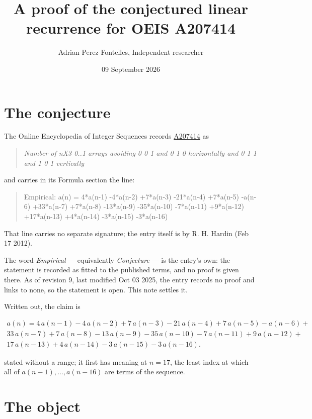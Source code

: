 \documentclass[11pt]{article}
\title{A proof of the conjectured linear recurrence for OEIS A207414}
\author{Adrian Perez Fontelles, Independent researcher}
\date{09 September 2026}
\theoremstyle{definition}
\begin{document}
\maketitle
\section{The conjecture}

The Online Encyclopedia of Integer Sequences records \href{https://oeis.org/A207414}{A207414} as

\begin{quote}\itshape Number of nX3 0..1 arrays avoiding 0 0 1 and 0 1 0 horizontally and 0 1 1 and 1 0 1 vertically\end{quote}

and carries in its Formula section the line:

\begin{quote}\ttfamily Empirical: a(n) = 4*a(n-1) -4*a(n-2) +7*a(n-3) -21*a(n-4) +7*a(n-5) -a(n-6) +33*a(n-7) +7*a(n-8) -13*a(n-9) -35*a(n-10) -7*a(n-11) +9*a(n-12) +17*a(n-13) +4*a(n-14) -3*a(n-15) -3*a(n-16)\end{quote}

That line carries no separate signature; the entry itself is by R. H. Hardin (Feb 17 2012).

The word {\itshape Empirical} --- equivalently {\itshape Conjecture} --- is the entry's own: the statement is recorded as fitted to the published terms, and no proof is given there. As of revision 9, last modified Oct 03 2025, the entry records no proof and links to none, so the statement is open. This note settles it.

Written out, the claim is

\begin{multline*} a(n) = 4\,a(n-1) - 4\,a(n-2) + 7\,a(n-3) - 21\,a(n-4) + 7\,a(n-5) - a(n-6) + \\ 33\,a(n-7) + 7\,a(n-8) - 13\,a(n-9) - 35\,a(n-10) - 7\,a(n-11) + 9\,a(n-12) + \\ 17\,a(n-13) + 4\,a(n-14) - 3\,a(n-15) - 3\,a(n-16). \end{multline*}

stated without a range; it first has meaning at $n = 17$, the least index at which all of $a(n-1),\dots,a(n-16)$ are terms of the sequence.

\section{The object}
\end{document}
